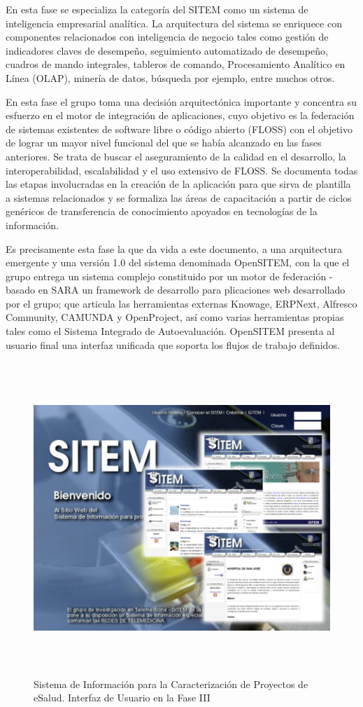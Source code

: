 En esta fase se especializa la categoría del SITEM como un sistema de inteligencia empresarial analítica. La arquitectura del sistema se enriquece con componentes relacionados con inteligencia de negocio tales como gestión de indicadores claves de desempeño, seguimiento automatizado de desempeño, cuadros de mando integrales, tableros de comando, Procesamiento Analítico en Línea (OLAP), minería de datos, búsqueda por ejemplo, entre muchos otros.

En esta fase el grupo toma una decisión arquitectónica importante y concentra su esfuerzo en el motor de integración de aplicaciones, cuyo objetivo es la federación de sistemas existentes de software libre o código abierto (FLOSS) con el objetivo de lograr un mayor nivel funcional del que se había alcanzado en las fases anteriores. Se trata de buscar el aseguramiento de la calidad en el desarrollo, la interoperabilidad, escalabilidad y el uso extensivo de FLOSS. Se documenta todas las etapas involucradas en la creación de la aplicación para que sirva de plantilla a sistemas relacionados y se formaliza las áreas de capacitación a partir de ciclos genéricos de transferencia de conocimiento apoyados en tecnologías de la información.

Es precisamente esta fase la que da vida a este documento, a una arquitectura emergente y una versión 1.0 del sistema denominada OpenSITEM, con la que el grupo entrega un sistema complejo constituido por un motor de federación - basado en SARA un framework de desarrollo para plicaciones web desarrollado por el grupo; que articula las herramientas externas Knowage, ERPNext, Alfresco Community, CAMUNDA y OpenProject, así como varias herramientas propias tales como el Sistema Integrado de Autoevaluación. OpenSITEM presenta al usuario final una interfaz unificada que soporta los flujos de trabajo definidos. 

\begin{figure}
 \centering
 \includegraphics[width=156mm, height=118mm]{pagina_principal.png}
 \caption{Sistema de Información para la Caracterización de Proyectos de eSalud. Interfaz de Usuario en la Fase III}
 \label{sitem_faseIII}
\end{figure}